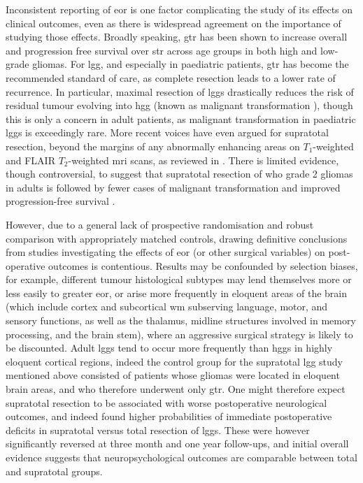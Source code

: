 \documentclass[12pt,phd,a4paper,twoside]{ucl_thesis}
\renewcommand{\textcite}[2][]{
\ifthenelse { \equal {#1} {} }  {\citeauthor{#2}\autocite{#2}}   {\citeauthor{#1}\autocite{#2}}}
\begin{document}
Inconsistent reporting of \gls{eor} is one factor complicating the study of its effects on clinical outcomes, even as there is widespread agreement on the importance of studying those effects\autocite{Rincon-Torroella2019,Wykes2021,Weller2021}.
Broadly speaking, \gls{gtr} has been shown to increase overall and progression free survival over \gls{str} across age groups in both high \autocite{Hatoum2022, Han2020, Adams2016, McCrea2015, Bloch2012, McGirt2009, Kramm2006} and low-grade \autocite{Keles2001, Pollack1995, Sanai2008} gliomas.
For \gls{lgg}, and especially in paediatric patients, \gls{gtr} has become the recommended standard of care, as complete resection leads to a lower rate of recurrence\autocite{Berger1994,Claus2005}.
In particular, maximal resection of \glspl{lgg} drastically reduces the risk of residual tumour evolving into \gls{hgg} (known as malignant transformation \autocite{Duffau2013,Hervey-Jumper2016,Rincon-Torroella2019}), though this is only a concern in adult patients, as malignant transformation in paediatric \glspl{lgg} is exceedingly rare\autocite{Collins2020}.
More recent voices have even argued for supratotal resection, beyond the margins of any abnormally enhancing areas on $T_1$-weighted and FLAIR $T_2$-weighted \gls{mri} scans, as reviewed in \textcite{deLeeuw2019}.
There is limited evidence, though controversial, to suggest that supratotal resection of \gls{who} grade 2 gliomas in adults is followed by fewer cases of malignant transformation and improved progression-free survival \autocite{Yordanova2011}.

However, due to a general lack of prospective randomisation and robust comparison with appropriately matched controls, drawing definitive conclusions from studies investigating the effects of \gls{eor} (or other surgical variables) on post-operative outcomes is contentious\autocite{deLeeuw2019,Keles2001}.
Results may be confounded by selection biases, for example, different tumour histological subtypes may lend themselves more or less easily to greater \gls{eor}, or arise more frequently in eloquent areas of the brain (which include cortex and subcortical \gls{wm} subserving language, motor, and sensory functions, as well as the thalamus, midline structures involved in memory processing, and the brain stem), where an aggressive surgical strategy is likely to be discounted\autocite{deLeeuw2019}.
Adult \glspl{lgg} tend to occur more frequently than \glspl{hgg} in highly eloquent cortical regions\autocite{Duffau2004}, indeed the control group for the supratotal \gls{lgg} study\autocite{Yordanova2011} mentioned above consisted of patients whose gliomas were located in eloquent brain areas, and who therefore underwent only \gls{gtr}.
One might therefore expect supratotal resection to be associated with worse postoperative neurological outcomes, and indeed \textcite{Rossi2019a} found higher probabilities of immediate postoperative deficits in supratotal versus total resection of \glspl{lgg}.
These were however significantly reversed at three month and one year follow-ups, and initial overall evidence suggests that neuropsychological outcomes are comparable between total and supratotal groups\autocite{Tabor2021}.
\end{document}
